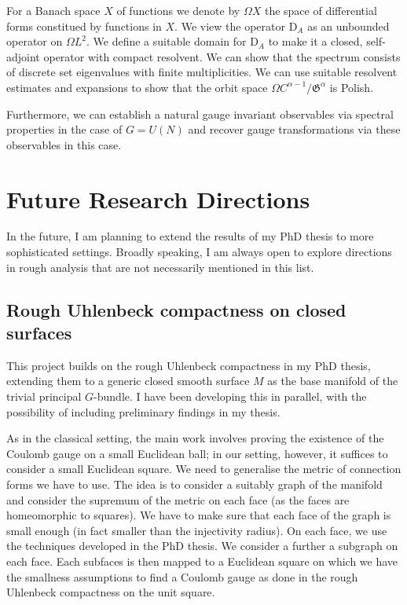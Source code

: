 \documentclass[12pt]{article}
\numberwithin{equation}{section}
\theoremstyle{definition}
\theoremstyle{remark}
\newcommand{\1}{\mathbf 1}
\newcommand{\<}{\langle}
\renewcommand{\>}{\rangle}
\newcommand{\rmD}{\mathrm{D}}
\begin{document}
For a Banach space $X$ of functions we denote by $\Omega X$ the space of differential forms constitued by functions in $X$. We view the operator $\rmD_A$ as an unbounded operator on $\Omega L^2$. We define a suitable domain for $\rmD_A$ to make it a closed, self-adjoint operator with compact resolvent. We can show that the spectrum consists of discrete set eigenvalues with finite multiplicities. We can use suitable resolvent estimates and expansions to show that the orbit space $\Omega C^{\alpha-1}/\mathfrak G^\alpha$ is Polish.

Furthermore, we can establish a natural gauge invariant observables via spectral properties  in the case of $G=U(N)$ and recover gauge transformations via these observables in this case.  



\section{Future Research Directions}\label{sec:future}
In the future, I am planning to extend the results of my PhD thesis to more sophisticated settings. Broadly speaking, I am always open to explore directions in rough analysis that are not necessarily mentioned in this list. 



\subsection{Rough Uhlenbeck compactness on closed surfaces}
%
This project builds on the rough Uhlenbeck compactness in my PhD thesis, extending them to a generic closed smooth surface $M$ as the base manifold of the trivial principal $G$-bundle. I have been developing this in parallel, with the possibility of including preliminary findings in my thesis.
%
%

As in the classical setting, the main work involves proving the existence of the Coulomb gauge on a small Euclidean ball; in our setting, however, it suffices to consider a small Euclidean square. We need to generalise the metric of connection forms we have to use. The idea is to consider a suitably graph of the manifold and consider the supremum of the metric on each face (as the faces are homeomorphic to squares). We have to make sure that each face of the graph is small enough (in fact smaller than the injectivity radius). On each face, we use the techniques developed in the PhD thesis. We consider a further a subgraph on each face. Each subfaces is then mapped to a Euclidean square on which we have the smallness assumptions to find a Coulomb gauge as done in the rough Uhlenbeck compactness on the unit square. 
\end{document}
